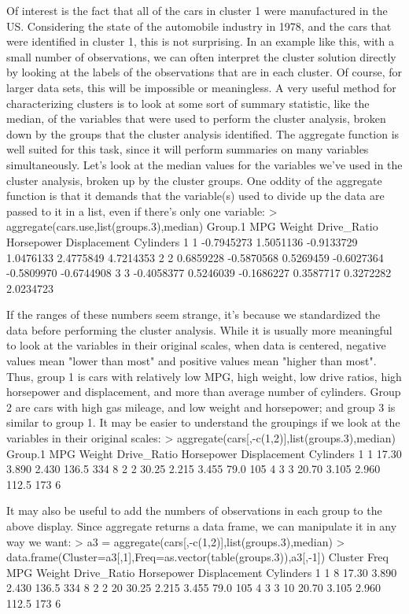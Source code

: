 {Of interest is the fact that all of the cars in cluster 1 were manufactured in the US. Considering the state of the automobile industry in 1978, and the cars that were identified in cluster 1, this is not surprising.
In an example like this, with a small number of observations, we can often interpret the cluster solution directly by looking at the labels of the observations that are in each cluster. Of course, for larger data sets, this will be impossible or meaningless. A very useful method for characterizing clusters is to look at some sort of summary statistic, like the median, of the variables that were used to perform the cluster analysis, broken down by the groups that the cluster analysis identified. The aggregate function is well suited for this task, since it will perform summaries on many variables simultaneously. Let's look at the median values for the variables we've used in the cluster analysis, broken up by the cluster groups. One oddity of the aggregate function is that it demands that the variable(s) used to divide up the data are passed to it in a list, even if there's only one variable:
> aggregate(cars.use,list(groups.3),median)
  Group.1        MPG     Weight Drive_Ratio Horsepower Displacement  Cylinders
1       1 -0.7945273  1.5051136  -0.9133729  1.0476133    2.4775849  4.7214353
2       2  0.6859228 -0.5870568   0.5269459 -0.6027364   -0.5809970 -0.6744908
3       3 -0.4058377  0.5246039  -0.1686227  0.3587717    0.3272282  2.0234723


If the ranges of these numbers seem strange, it's because we standardized the data before performing the cluster analysis. While it is usually more meaningful to look at the variables in their original scales, when data is centered, negative values mean "lower than most" and positive values mean "higher than most". Thus, group 1 is cars with relatively low MPG, high weight, low drive ratios, high horsepower and displacement, and more than average number of cylinders. Group 2 are cars with high gas mileage, and low weight and horsepower; and group 3 is similar to group 1. It may be easier to understand the groupings if we look at the variables in their original scales:
> aggregate(cars[,-c(1,2)],list(groups.3),median)
  Group.1   MPG Weight Drive_Ratio Horsepower Displacement Cylinders
1       1 17.30  3.890       2.430      136.5          334         8
2       2 30.25  2.215       3.455       79.0          105         4
3       3 20.70  3.105       2.960      112.5          173         6


It may also be useful to add the numbers of observations in each group to the above display. Since aggregate returns a data frame, we can manipulate it in any way we want:
> a3 = aggregate(cars[,-c(1,2)],list(groups.3),median)
> data.frame(Cluster=a3[,1],Freq=as.vector(table(groups.3)),a3[,-1])
  Cluster Freq   MPG Weight Drive_Ratio Horsepower Displacement Cylinders
1       1    8 17.30  3.890       2.430      136.5          334         8
2       2   20 30.25  2.215       3.455       79.0          105         4
3       3   10 20.70  3.105       2.960      112.5          173         6

}
